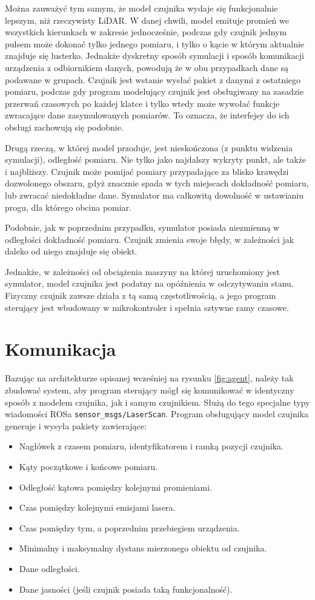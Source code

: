 	Można zauważyć tym samym, że model czujnika wydaje się funkcjonalnie lepszym, niż rzeczywisty LiDAR.
	W danej chwili, model emituje promień we wszystkich kierunkach w zakresie jednocześnie, podczas gdy czujnik jednym pulsem może dokonać tylko jednego pomiaru,
	i tylko o kącie w którym aktualnie znajduje się lusterko.
	Jednakże dyskretny sposób symulacji i sposób komunikacji urządzenia z odbiornikiem danych, powodują że w obu przypadkach dane są podawane w grupach.
	Czujnik jest wstanie wysłać pakiet z danymi z ostatniego pomiaru, podczas gdy program modelujący czujnik jest obsługiwany na zasadzie przerwań czasowych 
	po każdej klatce i tylko wtedy może wywołać funkcje zwracające dane zasymulowanych pomiarów.
	To oznacza, że interfejsy do ich obsługi zachowują się podobnie.

	Drugą rzeczą, w której model przoduje, jest nieskończona (z punktu widzenia symulacji), odległość pomiaru.
	Nie tylko jako najdalszy wykryty punkt, ale także i najbliższy. 
	Czujnik może pomijać pomiary przypadające za blisko krawędzi dozwolonego obszaru, gdyż znacznie spada w tych miejscach dokładność pomiaru, lub zwracać niedokładne dane.
	Symulator ma całkowitą dowolność w ustawianiu progu, dla którego obcina pomiar.

	Podobnie, jak w poprzednim przypadku, symulator posiada niezmienną w odległości dokładność pomiaru.
	Czujnik zmienia swoje błędy, w zależności jak daleko od niego znajduje się obiekt.

	Jednakże, w zależności od obciążenia maszyny na której uruchomiony jest symulator, model czujnika jest podatny na opóźnienia w odczytywaniu stanu.
	Fizyczny czujnik zawsze działa z tą samą częstotliwością, a jego program sterujący jest wbudowany w mikrokontroler i spełnia sztywne ramy czasowe.

\section{Komunikacja}
	Bazując na architekturze opisanej wcześniej na rysunku \ref{fig:agent}, należy tak zbudować system, aby program sterujący mógł się komunikować w identyczny sposób z 
	modelem czujnika, jak i samym czujnikiem.
	Służą do tego specjalne typy wiadomości ROSa \texttt{sensor\_msgs/LaserScan}.
	Program obsługujący model czujnika generuje i wysyła pakiety zawierające:
	\begin{itemize}
		\item Nagłówek z czasem pomiaru, identyfikatorem i ramką pozycji czujnika.
		\item Kąty początkowe i końcowe pomiaru.
		\item Odległość kątowa pomiędzy kolejnymi promieniami.
		\item Czas pomiędzy kolejnymi emisjami lasera.
		\item Czas pomiędzy tym, a poprzednim przebiegiem urządzenia.
		\item Minimalny i maksymalny dystans mierzonego obiektu od czujnika.
		\item Dane odległości.
		\item Dane jasności (jeśli czujnik posiada taką funkcjonalność).
	\end{itemize}

